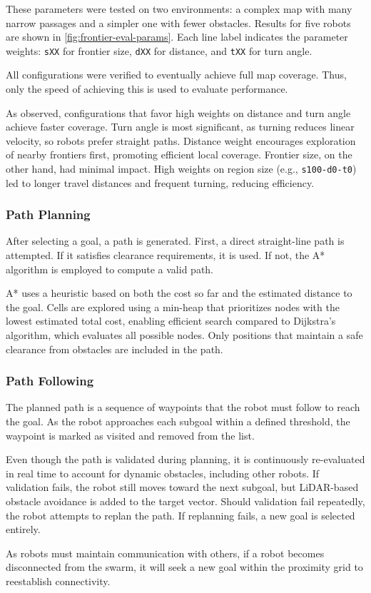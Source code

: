 These parameters were tested on two environments: a complex map with many narrow passages and a simpler one with fewer obstacles. Results for five robots are shown in \cref{fig:frontier-eval-params}. Each line label indicates the parameter weights: 
\texttt{sXX} for frontier size, \texttt{dXX} for distance, and \texttt{tXX} for turn angle.

All configurations were verified to eventually achieve full map coverage. Thus, only the speed of achieving this is used to evaluate performance.

As observed, configurations that favor high weights on distance and turn angle achieve faster coverage.
Turn angle is most significant, as turning reduces linear velocity, so robots prefer straight paths.
Distance weight encourages exploration of nearby frontiers first, promoting efficient local coverage.
Frontier size, on the other hand, had minimal impact. High weights on region size (e.g., \texttt{s100-d0-t0}) led to longer travel distances and frequent turning, reducing efficiency.

\subsubsection{Path Planning}\label{sec:path_planning}
After selecting a goal, a path is generated. First, a direct straight-line path is attempted. If it satisfies clearance requirements, it is used.
If not, the A* algorithm is employed to compute a valid path.

A* uses a heuristic based on both the cost so far and the estimated distance to the goal.
Cells are explored using a min-heap that prioritizes nodes with the lowest estimated total cost, enabling efficient search compared to Dijkstra’s algorithm, which evaluates all possible nodes.
Only positions that maintain a safe clearance from obstacles are included in the path.

\subsubsection{Path Following}\label{sec:path_following}
The planned path is a sequence of waypoints that the robot must follow to reach the goal.
As the robot approaches each subgoal within a defined threshold, the waypoint is marked as visited and removed from the list.

Even though the path is validated during planning, it is continuously re-evaluated in real time to account for dynamic obstacles, including other robots.
If validation fails, the robot still moves toward the next subgoal, but LiDAR-based obstacle avoidance is added to the target vector.
Should validation fail repeatedly, the robot attempts to replan the path. If replanning fails, a new goal is selected entirely.

As robots must maintain communication with others, if a robot becomes disconnected from the swarm, it will seek a new goal within the proximity grid to reestablish connectivity.
